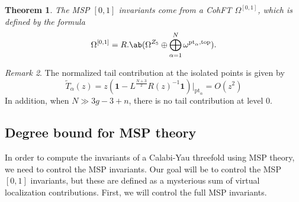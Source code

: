 \documentclass[10pt]{amsart}
\newtheorem{thm}{Theorem}[section]
\theoremstyle{definition}
\theoremstyle{remark}
\newtheorem{rmk}[thm]{Remark}
\theoremstyle{plain}
\theoremstyle{definition}
\theoremstyle{remark}
\newcommand{\mr}[1]{\mathrm{#1}}
\newcommand{\1}{\mathbf{1}}
\newcommand{\2}{\mathbf{2}}
\newcommand{\3}{\mathbf{3}}
\newcommand{\pt}{\mr{pt}}
\begin{document}
\begin{thm}
    The MSP $[0,1]$ invariants come from a CohFT $\Omega^{[0,1]}$, which is defined by the formula
    \[ \Omega^{[0,1]} = R . \ab(\Omega^{Z_5} \oplus \bigoplus_{\alpha=1}^N \omega^{\pt_{\alpha},\mr{top}}). \]
\end{thm}

\begin{rmk}
    The normalized tail contribution at the isolated points is given by
    \[ \tilde{T}_{\alpha}(z) = z (\1-L^{\frac{N+3}{2}} R(z)^{-1}\1) |_{\pt_{\alpha}} = O(z^2) \]
     In addition, when $N \gg 3g-3+n$, there is no tail contribution at level $0$.
\end{rmk}

\subsection{Degree bound for MSP theory}%
\label{sub:Degree bound for MSP theory}

In order to compute the invariants of a Calabi-Yau threefold using MSP theory, we need to control the MSP invariants. Our goal will be to control the MSP $[0,1]$ invariants, but these are defined as a mysterious sum of virtual localization contributions. First, we will control the full MSP invariants.
\end{document}
